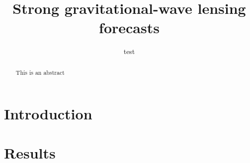 \documentclass[linenumbers]{aastex631}
\begin{document}
\title{Strong gravitational-wave lensing forecasts}


\author[0000-0002-0786-7307]{test}


\begin{abstract}
This is an abstract
\end{abstract}



\section{Introduction} \label{sec:intro}


\section{Results}
\end{document}
